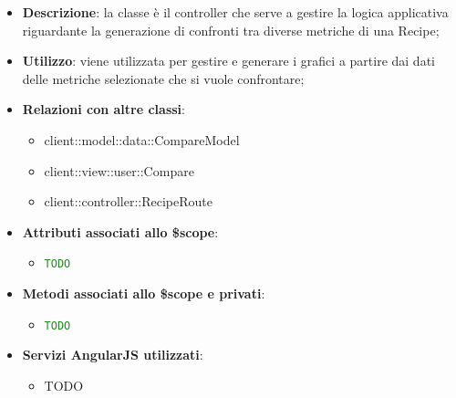 			\begin{itemize}
				\item \textbf{Descrizione}: la classe è il controller che serve a gestire la logica applicativa riguardante la generazione di confronti tra diverse metriche di una Recipe;
				\item \textbf{Utilizzo}: viene utilizzata per gestire e generare i grafici a partire dai dati delle metriche selezionate che si vuole confrontare;
				\item \textbf{Relazioni con altre classi}:
					\begin{itemize}
						\item client::model::data::CompareModel
						\item client::view::user::Compare
						\item client::controller::RecipeRoute
					\end{itemize}

				\item \textbf{Attributi associati allo \$scope}:
					\begin{itemize}
						\item \textcolor{forestgreen}{\texttt{TODO}}

					\end{itemize}

				\item \textbf{Metodi associati allo \$scope e privati}:
					\begin{itemize}
						\item \textcolor{forestgreen}{\texttt{TODO}}

					\end{itemize}

				\item \textbf{Servizi AngularJS utilizzati}:
					\begin{itemize}
						\item TODO
					\end{itemize}

			\end{itemize}

